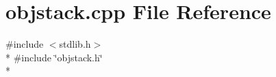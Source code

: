 \section{objstack.\+cpp File Reference}
\label{objstack_8cpp}
{\ttfamily \#include $<$stdlib.\+h$>$}\\*
{\ttfamily \#include \char`\"{}objstack.\+h\char`\"{}}\\*
